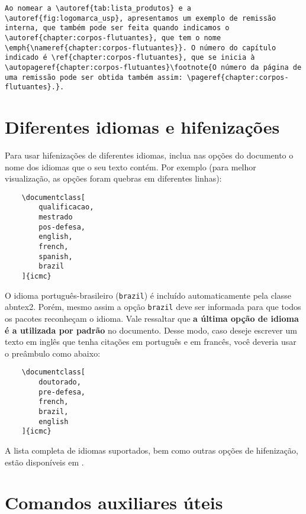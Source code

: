 \begin{verbatim}
Ao nomear a \autoref{tab:lista_produtos} e a \autoref{fig:logomarca_usp}, apresentamos um exemplo de remissão interna, que também pode ser feita quando indicamos o \autoref{chapter:corpos-flutuantes}, que tem o nome \emph{\nameref{chapter:corpos-flutuantes}}. O número do capítulo indicado é \ref{chapter:corpos-flutuantes}, que se inicia à \autopageref{chapter:corpos-flutuantes}\footnote{O número da página de uma remissão pode ser obtida também assim: \pageref{chapter:corpos-flutuantes}.}.
\end{verbatim}

\section{Diferentes idiomas e hifenizações}
\label{sec-hifenizacao}

Para usar hifenizações de diferentes idiomas, inclua nas opções do documento o nome dos idiomas que o seu texto contém. Por exemplo (para melhor visualização, as opções foram quebras em diferentes linhas):

\begin{verbatim}
    \documentclass[
        qualificacao,
        mestrado
        pos-defesa,
        english,
        french,
        spanish,
        brazil
    ]{icmc}
\end{verbatim}

O idioma português-brasileiro (\texttt{brazil}) é incluído automaticamente pela classe \textsf{abntex2}. Porém, mesmo assim a opção \texttt{brazil} deve ser informada para que todos os pacotes reconheçam o idioma. Vale ressaltar que \textbf{a última opção de idioma é a utilizada por padrão} no documento. Desse modo, caso deseje escrever um texto em inglês que tenha citações em português e em francês, você deveria usar o preâmbulo como abaixo:

\begin{verbatim}
    \documentclass[
        doutorado,
        pre-defesa,
        french,
        brazil,
        english
    ]{icmc}
\end{verbatim}

A lista completa de idiomas suportados, bem como outras opções de hifenização, estão disponíveis em .


\section{Comandos auxiliares úteis}

